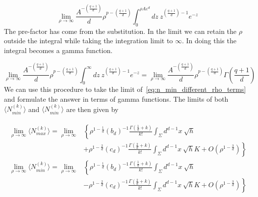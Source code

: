 \documentclass[12pt]{article}
\newcommand{\be}{\begin{equation}}
\newcommand{\ee}{\end{equation}}
\begin{document}
\be\label{eq:incomplete_gamma_function}
\lim_{\rho\rightarrow\infty}\frac{A^{-\left(\frac{q+1}{d} \right)}}{d}\rho^{p-\left(\frac{q+1}{d} \right)}\int_{0}^{\rho A \varepsilon^d}dz\
z^{\left(\frac{q+1}{d} \right)-1}e^{-z}
\ee
The pre-factor has come from the substitution. In the limit we can retain the $\rho$ outside the integral while taking the integration limit to $\infty$. In doing this the integral becomes a gamma function.

\be\label{eq:gamma_function}
\lim_{\rho\rightarrow\infty}\frac{A^{-\left(\frac{q+1}{d} \right)}}{d}\rho^{p-\left(\frac{q+1}{d} \right)}\int_{0}^{\infty}dz\
z^{\left(\frac{q+1}{d} \right)-1}e^{-z}=\lim_{\rho\rightarrow\infty}
\frac{A^{-\left(\frac{q+1}{d} \right)}}{d}\rho^{p-\left(\frac{q+1}{d} \right)}\Gamma\left( \frac{q+1}{d} \right)
\ee
We can use this procedure to take the limit of~\eqref{eq:n_min_different_rho_terms} and formulate the answer in terms of gamma functions. The limits of both $\langle N_{min}^{(k)}\rangle$ and $\langle N_{min}^{(k)}\rangle$ are then given by

\begin{gather}\label{eq:nmax_nmin_final}
\begin{aligned}
\lim_{\rho\rightarrow\infty}\langle N_{max}^{(k)}\rangle = \lim_{\rho\rightarrow\infty} & \left\lbrace \rho^{1-\frac{1}{d}} \left(b_d\right)^{-1} \frac{\Gamma\left(\frac{1}{d}+k\right)}{k!}
\int_{\Sigma}d^{d-1}x\: \sqrt{h} \right.
 \\
 &  \left. +\rho^{1-\frac{2}{d}} \left(c_d\right)^{-1} \frac{\Gamma\left(\frac{2}{d}+k\right)}{k!}
\int_{\Sigma}d^{d-1}x\: \sqrt{h}K + O\left(\rho^{1-\frac{3}{d}} \right) \right\rbrace
\\
\lim_{\rho\rightarrow\infty}\langle N_{min}^{(k)}\rangle = \lim_{\rho\rightarrow\infty} & \left\lbrace \rho^{1-\frac{1}{d}} \left(b_d\right)^{-1} \frac{\Gamma\left(\frac{1}{d}+k\right)}{k!}
\int_{\Sigma}d^{d-1}x\: \sqrt{h} \right.
 \\
 &  \left. -\rho^{1-\frac{2}{d}} \left(c_d\right)^{-1} \frac{\Gamma\left(\frac{2}{d}+k\right)}{k!}
\int_{\Sigma}d^{d-1}x\: \sqrt{h}K + O\left(\rho^{1-\frac{3}{d}} \right) \right\rbrace
\\
\end{aligned}
\end{gather}
\end{document}
